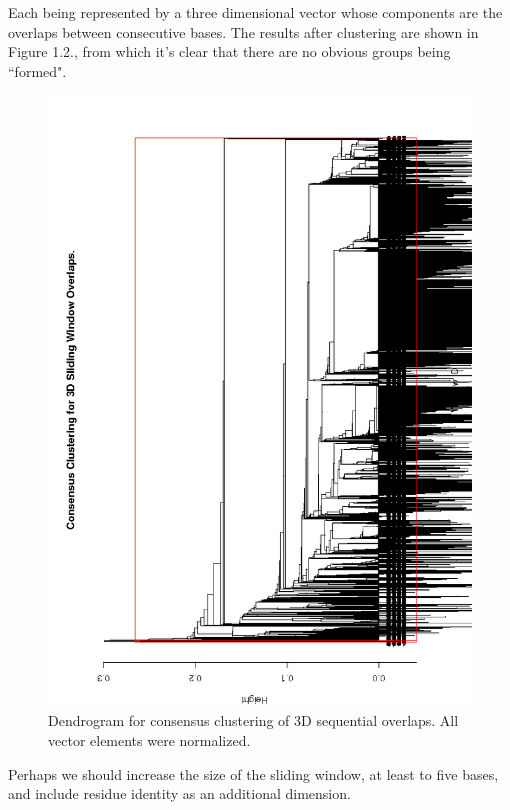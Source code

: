 Each being represented by a three dimensional vector whose components
are the overlaps between consecutive bases.
The results after clustering are shown in Figure 1.2.,  from which it's clear that
there are no obvious groups being ``formed".
\begin{figure}[htbp]
\centering 
\includegraphics[angle=0, scale=0.8]{Chapter5/3Dwindow.png}
\caption{Dendrogram for consensus clustering of 3D sequential
overlaps. All vector elements were normalized.}
\end{figure}
Perhaps we should increase the size of
the sliding window, at least to five bases, and include residue identity as
an additional dimension.

